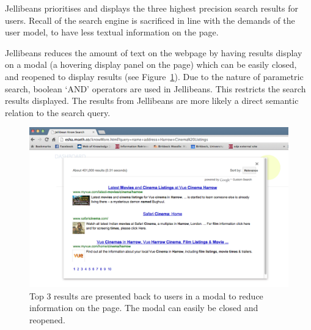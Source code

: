 \documentclass[a4paper, 11pt]{article}
\begin{document}
Jellibeans prioritises and displays the three highest precision search results for users. Recall of the search engine is sacrificed in line with the demands of the user model, to have less textual information on the page.

\vspace{5mm}
Jellibeans reduces the amount of text on the webpage by having results display on a modal (a hovering display panel on the page) which can be easily closed, and reopened to display results (see Figure~\ref{resultsModal}). Due to the nature of parametric search, boolean `AND' operators are used in Jellibeans. This restricts the search results displayed. The results from Jellibeans are more likely a direct semantic relation to the search query. 

\begin{figure}[H]
\begin{center}
\includegraphics[scale=0.25]{ResultsModal}
\end{center}
\caption{Top 3 results are presented back to users in a modal to reduce information on the page. The modal can easily be closed and reopened.}
\label{resultsModal}
\end{figure}

\end{document}
